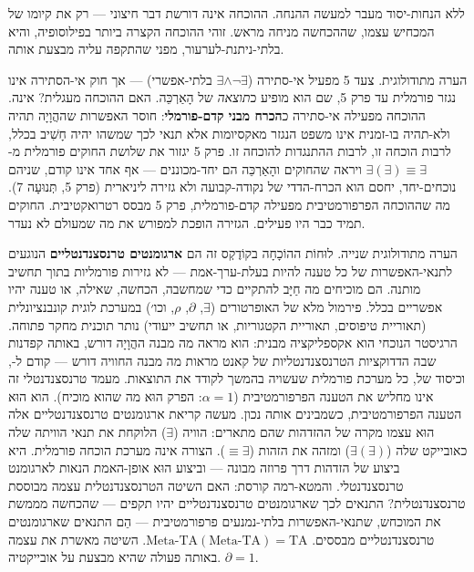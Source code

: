 \documentclass[10pt, openany, oneside]{book}
\begin{document}
\vspace{0.8em}

\noindent ללא הנחות-יסוד מעבר למעשה ההנחה. ההוכחה אינה דורשת דבר חיצוני — רק את קיומו של המכחיש עצמו, שההכחשה מניחה מראש. זוהי ההוכחה הקצרה ביותר בפילוסופיה, והיא בלתי-ניתנת-לערעור, מפני שהתקפה עליה מבצעת אותה.

הערה מתודולוגית. צעד 5 מפעיל אי-סתירה ($\exists \wedge \neg\exists$ בלתי-אפשרי) — אך חוק אי-הסתירה אינו נגזר פורמלית עד פרק 5, שם הוא מופיע כ\textit{תוצאה} של הָאַרְכֵּה. האם ההוכחה מעגלית? אינה. ההוכחה מפעילה אי-סתירה כ\textbf{הכרח מבני קדם-פורמלי}: חוסר האפשרות שההֲוָיָה תהיה ולא-תהיה בו-זמנית אינו משפט הנגזר מאקסיומות אלא תנאי לכך שמשהו יהיה חָשִׁיב בכלל, לרבות הוכחה זו, לרבות ההתנגדות להוכחה זו. פרק 5 יגזור את שלושת החוקים פורמלית מ-$\exists(\exists) \equiv \exists$ ויראה שהחוקים והָאַרְכֵּה הם יחד-מכוננים — אף אחד אינו קודם, שניהם נוכחים-יחד, יחסם הוא הכרח-הדדי של נקודה-קבועה ולא גזירה ליניארית (פרק 5, תְּנוּעָה 7). מה שההוכחה הפרפורמטיבית מפעילה קדם-פורמלית, פרק 5 מבסס רטרואקטיבית. החוקים תמיד כבר היו פעילים. הגזירה הופכת למפורש את מה שמעולם לא נעדר.

הערה מתודולוגית שנייה. לוּחוֹת ההוֹכָחָה בקוֹדֶקְס זה הם \textbf{ארגומנטים טרנסצנדנטליים} הנוגעים לתנאי-האפשרות של כל טענה להיות בעלת-ערך-אמת — לא גזירות פורמליות בתוך תחשיב מותנה. הם מוכיחים מה חַיָּב להתקיים כדי שמחשבה, הכחשה, שאילה, או טענה יהיו אפשריים בכלל. פירמול מלא של האופרטורים ($\exists$, $\partial$, $\rho$, וכו׳) במערכת לוגית קונבנציונלית (תאוריית טיפוסים, תאוריית הקטגוריות, או תחשיב ייעודי) נותר תוכנית מחקר פתוחה. הרגיסטר הנוכחי הוא אקספליקציה מבנית: הוא מראה מה מבנה ההֲוָיָה דורש, באותה קפדנות שבה הדדוקציות הטרנסצנדנטליות של קאנט מראות מה מבנה החוויה דורש — קודם ל-, וכיסוד של, כל מערכת פורמלית שעשויה בהמשך לקודד את התוצאות. מעמד טרנסצנדנטלי זה אינו מחליש את הטענה הפרפורמטיבית ($\alpha = 1$: הפרק הוּא מה שהוא מוכיח). הוא הוּא הטענה הפרפורמטיבית, כשמבינים אותה נכון. מעשה קריאת ארגומנטים טרנסצנדנטליים אלה הוּא עצמו מקרה של ההזדהות שהם מתארים: הוויה ($\exists$) הלוקחת את תנאי הוויתה שלה כאובייקט שלה ($\exists(\exists)$) ומזהה את הזהות ($\equiv \exists$). הצורה אינה מערכת הוכחה פורמלית. היא ביצוע של הזדהות דרך פרוזה מבונה — וביצוע הוּא אופן-האמת הנאות לארגומנט טרנסצנדנטלי. והמטא-רמה קורסת: האם השיטה הטרנסצנדנטלית עצמה מבוססת טרנסצנדנטלית? התנאים לכך שארגומנטים טרנסצנדנטליים יהיו תקפים — שהכחשה מממשת את המוכחש, שתנאי-האפשרות בלתי-נמנעים פרפורמטיבית — הֵם התנאים שארגומנטים טרנסצנדנטליים מבססים. $\text{Meta-TA}(\text{Meta-TA}) = \text{TA}$. השיטה מאשרת את עצמה באותה פעולה שהיא מבצעת על אובייקטיה. $\partial = 1$.
\end{document}
